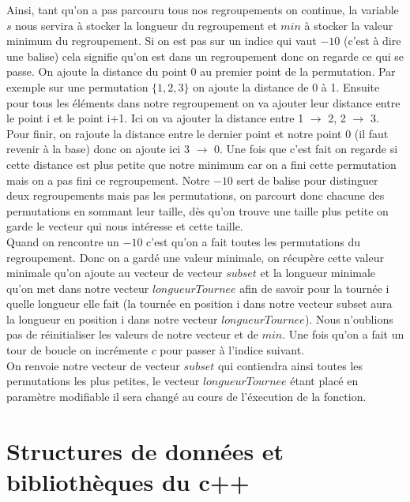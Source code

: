 \documentclass[a4paper,sffamily,12pt]{article}
\begin{document}
			\vspace{0.5cm}		
		
			Ainsi,  tant qu'on a pas parcouru tous nos regroupements on continue, la variable $s$ nous servira à stocker la longueur du regroupement et $min$ à stocker la valeur minimum du regroupement. Si on est pas sur un indice qui vaut $-10$ (c'est à dire une balise) cela signifie qu'on est dans un regroupement donc on regarde ce qui se passe. On ajoute la distance du point 0 au premier point de la permutation. Par exemple sur une permutation $\{1,2,3\}$ on ajoute la distance de 0 à 1. Ensuite pour tous les éléments dans notre regroupement on va ajouter leur distance entre le point i et le point i+1. Ici on va ajouter la distance entre 1 $\rightarrow$ 2, 2 $\rightarrow$ 3. Pour finir, on rajoute la distance entre le dernier point et notre point 0 (il faut revenir à la base) donc on ajoute ici 3 $\rightarrow$ 0. Une fois que c'est fait on regarde si cette distance est plus petite que notre minimum car on a fini cette permutation mais on a pas fini ce regroupement. Notre $-10$ sert de balise pour distinguer deux regroupements mais pas les permutations, on parcourt donc chacune des permutations en sommant leur taille, dès qu'on trouve une taille plus petite on garde le vecteur qui nous intéresse et cette taille. \\
			 \indent Quand on rencontre un $-10$ c'est qu'on a fait toutes les permutations du regroupement. Donc on a gardé une valeur minimale, on récupère cette valeur minimale qu'on ajoute au vecteur de vecteur $subset$ et la longueur minimale qu'on met dans notre vecteur $longueurTournee$ afin de savoir pour la tournée i quelle longueur elle fait (la tournée en position i dans notre vecteur subset aura la longueur en position i dans notre vecteur $longueurTournee$). Nous n'oublions pas de réinitialiser les valeurs de notre vecteur et de $min$. Une fois qu'on a fait un tour de boucle on incrémente $c$ pour passer à l'indice suivant.  \\
			\indent On renvoie notre vecteur de vecteur  $subset$ qui contiendra ainsi toutes les permutations les plus petites, le vecteur $longueurTournee$ étant placé en paramètre modifiable il sera changé au cours de l'éxecution de la fonction.



	\section{Structures de données et bibliothèques du c++}		
					
\end{document}
